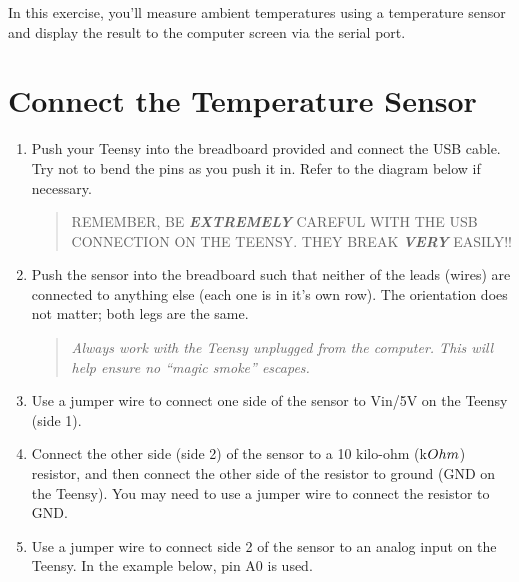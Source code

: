\documentclass[]{book}
\begin{document}
In this exercise, you'll measure ambient temperatures using a temperature sensor and display the result to the computer screen via the serial port.

\hypertarget{connect-the-temperature-sensor}{%
\section{Connect the Temperature Sensor}\label{connect-the-temperature-sensor}}

\begin{enumerate}
\def\labelenumi{\arabic{enumi}.}
\item
  Push your Teensy into the breadboard provided and connect the USB cable. Try not to bend the pins as you push it in. Refer to the diagram below if necessary.

  \begin{quote}
  REMEMBER, BE \textbf{\emph{EXTREMELY}} CAREFUL WITH THE USB CONNECTION ON THE TEENSY. THEY BREAK \textbf{\emph{VERY}} EASILY!!
  \end{quote}
\item
  Push the sensor into the breadboard such that neither of the leads (wires) are connected to anything else (each one is in it's own row). The orientation does not matter; both legs are the same.

  \begin{quote}
  \emph{Always work with the Teensy unplugged from the computer. This will help ensure no ``magic smoke'' escapes.}
  \end{quote}
\item
  Use a jumper wire to connect one side of the sensor to Vin/5V on the Teensy (side 1).
\item
  Connect the other side (side 2) of the sensor to a 10 kilo-ohm (k\(\\Ohm\)) resistor, and then connect the other side of the resistor to ground (GND on the Teensy). You may need to use a jumper wire to connect the resistor to GND.
\item
  Use a jumper wire to connect side 2 of the sensor to an analog input on the Teensy. In the example below, pin A0 is used.
\end{enumerate}
\end{document}
